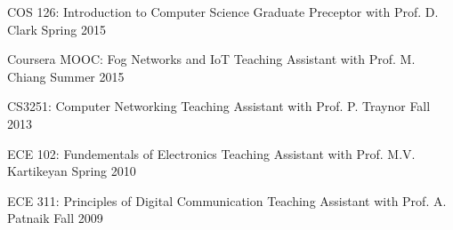 

\begin{cvhonors}
  \cvhonor
    {COS 126: Introduction to Computer Science} %
    {Graduate Preceptor with Prof. D. Clark} %
    {Spring 2015} %
    {} %
    
  \cvhonor
    {Coursera MOOC: Fog Networks and IoT} %
    {Teaching Assistant with Prof. M. Chiang} %
    {Summer 2015} %
    {} %
    
\end{cvhonors}
    

\begin{cvhonors}
  \cvhonor
    {CS3251: Computer Networking} %
    {Teaching Assistant with Prof. P. Traynor} %
    {Fall 2013} %
    {} %

\end{cvhonors}


\begin{cvhonors}
  \cvhonor
    {ECE 102: Fundementals of Electronics} %
    {Teaching Assistant with Prof. M.V. Kartikeyan} %
    {Spring 2010} %
    {} %

  \cvhonor
    {ECE 311: Principles of Digital Communication} %
    {Teaching Assistant with Prof. A. Patnaik} %
    {Fall 2009} %
    {} %

\end{cvhonors}
